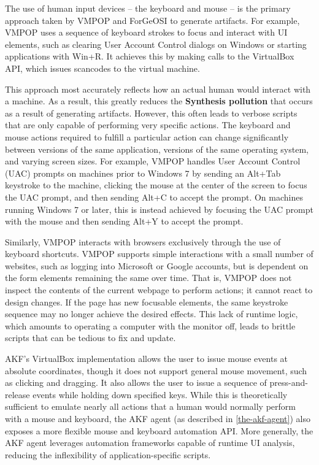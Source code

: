 \documentclass[letterpaper,12pt]{report}
\begin{document}
The use of human input devices -- the keyboard and mouse -- is the
primary approach taken by VMPOP \cite{parkTREDEVMPOPCultivating2018}
and ForGeOSI \cite{maxfraggMaxfraggForGeOSI2023} to generate
artifacts. For example, VMPOP uses a sequence of keyboard strokes to
focus and interact with UI elements, such as clearing User Account
Control dialogs on Windows or starting applications with Win+R. It
achieves this by making calls to the VirtualBox API, which issues
scancodes to the virtual machine.

This approach most accurately reflects how an actual human would
interact with a machine. As a result, this greatly reduces the
\textbf{Synthesis pollution} that occurs as a result of generating
artifacts. However, this often leads to verbose scripts that are only
capable of performing very specific actions. The keyboard and mouse
actions required to fulfill a particular action can change significantly
between versions of the same application, versions of the same operating
system, and varying screen sizes. For example, VMPOP handles User
Account Control (UAC) prompts on machines prior to Windows 7 by sending
an Alt+Tab keystroke to the machine, clicking the mouse at the center of
the screen to focus the UAC prompt, and then sending Alt+C to accept the
prompt. On machines running Windows 7 or later, this is instead achieved
by focusing the UAC prompt with the mouse and then sending Alt+Y to
accept the prompt.

Similarly, VMPOP interacts with browsers exclusively through the use of
keyboard shortcuts. VMPOP supports simple interactions with a small
number of websites, such as logging into Microsoft or Google accounts,
but is dependent on the form elements remaining the same over time. That
is, VMPOP does not inspect the contents of the current webpage to
perform actions; it cannot react to design changes. If the page has new
focusable elements, the same keystroke sequence may no longer achieve
the desired effects. This lack of runtime logic, which amounts to
operating a computer with the monitor off, leads to brittle scripts that
can be tedious to fix and update.

AKF's VirtualBox implementation allows the user to issue mouse events at
absolute coordinates, though it does not support general mouse movement,
such as clicking and dragging. It also allows the user to issue a
sequence of press-and-release events while holding down specified keys.
While this is theoretically sufficient to emulate nearly all actions
that a human would normally perform with a mouse and keyboard, the AKF
agent (as described in \autoref{the-akf-agent}) also exposes a more flexible mouse and keyboard automation API.
More generally, the AKF agent leverages automation frameworks capable of
runtime UI analysis, reducing the inflexibility of application-specific
scripts.
\end{document}

